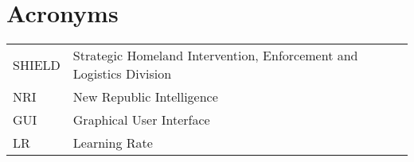 \chapter*{Acronyms}
\begin{tabular}{ll}
SHIELD & Strategic Homeland Intervention, Enforcement and Logistics Division\\
NRI & New Republic Intelligence\\
GUI & Graphical User Interface\\
LR & Learning Rate\\
\end{tabular}
